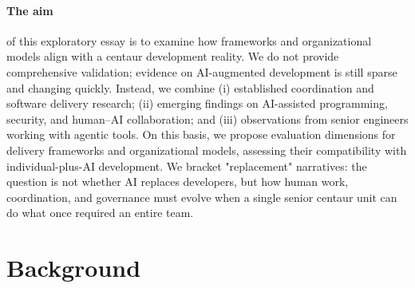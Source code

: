 \documentclass[11pt, a4paper, twocolumn]{article} %
\begin{document}

\paragraph{The aim} of this exploratory essay is to examine how frameworks and organizational models align with
a centaur development reality. We do not provide comprehensive validation;
evidence on AI-augmented development is still sparse and changing quickly. Instead, we combine (i) established coordination and software delivery research; (ii) emerging findings on AI-assisted programming, security, and human--AI collaboration; and (iii)
observations from senior engineers working with agentic tools. On this basis, we
propose evaluation dimensions for delivery frameworks and organizational models,
assessing their compatibility with individual-plus-AI development. We bracket
"replacement" narratives: the question is not whether AI replaces developers,
but how human work, coordination, and governance must evolve when a single
senior centaur unit can do what once required an entire team.

\section*{Background}
\end{document}
